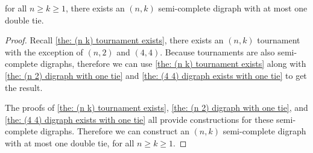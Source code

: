   \begin{theorem}
    for all \(n \geq k \geq 1\),
    there exists an \((n, k)\) semi-complete digraph with
    at most one double tie.
  \end{theorem}

  \begin{proof}
    Recall \cref{the: (n k) tournament exists},
    there exists an \((n, k)\) tournament
    with the exception of \((n, 2)\) and \((4, 4)\).
    Because tournaments are also semi-complete digraphs,
    therefore we can use \cref{the: (n k) tournament exists}
    along with \cref{the: (n 2) digraph with one tie}
    and \cref{the: (4 4) digraph exists with one tie}
    to get the result.

    The proofs of \cref{the: (n k) tournament exists},
    \cref{the: (n 2) digraph with one tie},
    and \cref{the: (4 4) digraph exists with one tie}
    all provide constructions for these semi-complete digraphs.
    Therefore we can construct an \((n, k)\)
    semi-complete digraph with at most one double tie,
    for all \(n \geq k \geq 1\).
  \end{proof}


